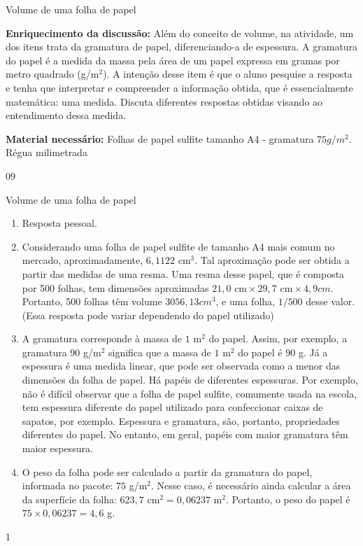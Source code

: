 \begin{sugestions}{Volume de uma folha de papel}
{\textbf{Enriquecimento da discussão:} Além do conceito de volume, na atividade, um dos itens trata da gramatura de papel, diferenciando-a de espessura. A gramatura do papel é a medida da massa pela área de um papel expressa em gramas por metro quadrado (g/m\(^2\)). A intenção desse item é que o aluno pesquise a resposta e tenha que interpretar e compreender a informação obtida, que é essencialmente matemática: uma medida. Discuta diferentes respostas obtidas visando ao entendimento dessa medida.

\textbf{Material necessário:} Folhas de papel sulfite tamanho A4 - gramatura \(75g/m^2\).
Régua milimetrada
}{0}{9}
\end{sugestions}
\begin{answer}{Volume de uma folha de papel}
{
\begin{enumerate}
\item {} 
Resposta pessoal.

\item {} 
Considerando uma folha de papel sulfite de tamanho A4 mais comum no mercado, aproximadamente, $6{,}1122$ cm\(^3\). Tal aproximação pode ser obtida a partir das medidas de uma resma. Uma resma desse papel, que é composta por 500 folhas, tem dimensões aproximadas $21{,}0\text{ cm}\times 29{,}7\text{ cm} \times 4{,}9{ cm}$. Portanto, 500 folhas têm volume \(3056,13cm^3\), e uma folha, $1/500$ desse valor. (Essa resposta pode variar dependendo do papel utilizado)

\item {} 
A gramatura corresponde à massa de \(1\) m$^2$ do papel. Assim, por exemplo, a gramatura \(90\) g/m$^2$ significa que a massa de \(1\) m$^2$ do papel é \(90\) g. Já a espessura é uma medida linear, que pode ser observada como a menor das dimensões da folha de papel. Há papéis de diferentes espessuras. Por exemplo, não é difícil observar que a folha de papel sulfite, comumente usada na escola, tem espessura diferente do papel utilizado para confeccionar caixas de sapatos, por exemplo. Espessura e gramatura, são, portanto, propriedades diferentes do papel. No entanto, em geral, papéis com maior gramatura têm maior espessura.

\item {} 
O peso da folha pode ser calculado a partir da gramatura do papel, informada no pacote:  \(75\) g/m$^2$. Nesse caso, é necessário ainda calcular a área da superfície da folha: \(623{,}7\text{ cm}^2 = 0{,}06237\text{ m}^2\). Portanto, o peso do papel é \(75 \times 0{,}06237 = 4{,}6\) g.

\end{enumerate}
}{1}
\end{answer}
